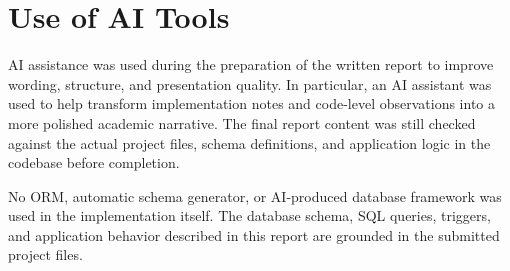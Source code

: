 \documentclass[12pt,a4paper]{article}
\begin{document}
\section{Use of AI Tools}
AI assistance was used during the preparation of the written report to improve wording, structure, and presentation quality. In particular, an AI assistant was used to help transform implementation notes and code-level observations into a more polished academic narrative. The final report content was still checked against the actual project files, schema definitions, and application logic in the codebase before completion.

No ORM, automatic schema generator, or AI-produced database framework was used in the implementation itself. The database schema, SQL queries, triggers, and application behavior described in this report are grounded in the submitted project files.
\end{document}
